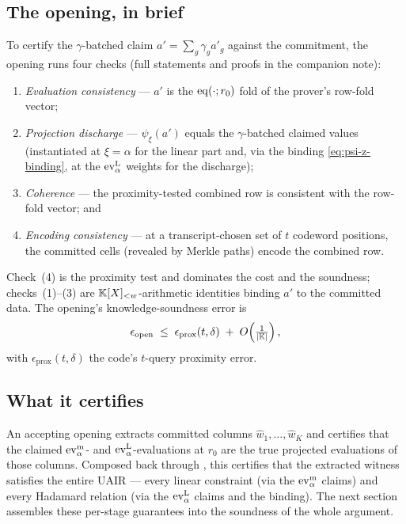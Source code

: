 \subsection{The opening, in brief}
\label{sec:pcs-checks}

To certify the $\gamma$-batched claim $a'=\sum_g\gamma_g a'_g$ against the
commitment, the opening runs four checks (full statements and proofs in the
companion note):
\begin{enumerate}[leftmargin=2em]
  \item \emph{Evaluation consistency} --- $a'$ is the $\operatorname{eq}(\cdot;r_0)$ fold of
    the prover's row-fold vector;
  \item \emph{Projection discharge} --- $\psi_\xi(a')$ equals the
    $\gamma$-batched claimed values (instantiated at $\xi=\alpha$ for the
    linear part and, via the binding \eqref{eq:psi-z-binding}, at the
    $\operatorname{ev}^{\mathrm{L}}_{\alpha}$ weights for the discharge);
  \item \emph{Coherence} --- the proximity-tested combined row is consistent
    with the row-fold vector; and
  \item \emph{Encoding consistency} --- at a transcript-chosen set of
    $t$ codeword positions, the committed cells (revealed by Merkle paths)
    encode the combined row.
\end{enumerate}
Check~(4) is the proximity test and dominates the cost and the soundness;
checks~(1)--(3) are $\mathbb{K}[X]_{<w}$-arithmetic identities binding $a'$ to
the committed data. The opening's knowledge-soundness error is
\[
  \epsilon_{\mathrm{open}} \;\le\;
  \epsilon_{\mathrm{prox}}(t,\delta) \;+\; O\!\left(\tfrac{1}{|\mathbb{K}|}\right),
\]
with $\epsilon_{\mathrm{prox}}(t,\delta)$ the code's $t$-query proximity
error.

\subsection{What it certifies}
\label{sec:pcs-certifies}

An accepting opening extracts committed columns $\widehat w_1,\dots,\widehat
w_K$ and certifies that the claimed $\operatorname{ev}^{\mathrm{m}}_{\alpha}$- and $\operatorname{ev}^{\mathrm{L}}_{\alpha}$-evaluations at $r_0$
are the true projected evaluations of those columns. Composed back through
, this certifies that the extracted witness
satisfies the entire UAIR --- every linear constraint (via the $\operatorname{ev}^{\mathrm{m}}_{\alpha}$
claims) and every Hadamard relation (via the $\operatorname{ev}^{\mathrm{L}}_{\alpha}$ claims and the binding).
The next section assembles these per-stage guarantees into the soundness of
the whole argument.
